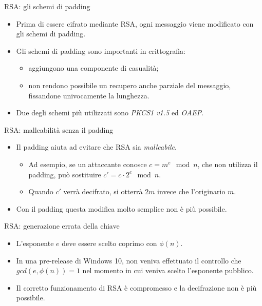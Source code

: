 \documentclass[11pt,svgnames,smaller,aspectratio=169,italian]{beamer}
\begin{document}
\begin{frame}{RSA: gli schemi di padding}
	\begin{itemize}
		\item Prima di essere cifrato mediante RSA, ogni messaggio viene modificato con gli schemi di padding.
		\item Gli schemi di padding sono importanti in crittografia:
			\begin{itemize}
				\item aggiungono una componente di casualità;
				\item non rendono possibile un recupero anche parziale del messaggio, fissandone univocamente la lunghezza.
			\end{itemize}
		\item Due degli schemi più utilizzati sono \emph{PKCS1 v1.5} ed \emph{OAEP}.
	\end{itemize}
\end{frame}

\begin{frame}{RSA: malleabilità senza il padding}
	\begin{itemize}
		\item Il padding aiuta ad evitare che RSA sia \emph{malleabile}.
			\begin{itemize}
				\item Ad esempio, se un attaccante conosce $c = m^{e} \mod n$, che non utilizza il padding, può sostituire $c' = c \cdot 2^{e} \mod n$.
				\item Quando $c'$ verrà decifrato, si otterrà $2m$ invece che l'originario $m$.
			\end{itemize}
		\item Con il padding questa modifica molto semplice non è più possibile.
	\end{itemize}
\end{frame}

\begin{frame}{RSA: generazione errata della chiave}
	\begin{itemize}
		\item L'esponente $e$ deve essere scelto coprimo con $\phi(n)$.
		\item In una pre-release di Windows 10, non veniva effettuato il controllo che $gcd(e,\phi(n)) = 1$ nel momento in cui veniva scelto l'esponente pubblico.
		\item Il corretto funzionamento di RSA è compromesso e la decifrazione non è più possibile.
	\end{itemize}
\end{frame}
\end{document}
